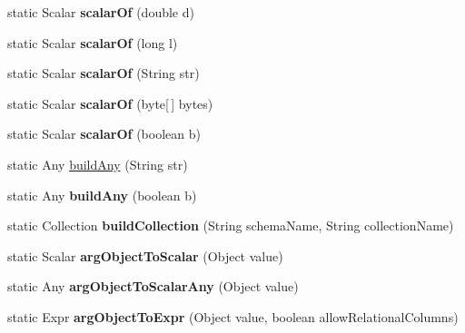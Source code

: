 \begin{DoxyCompactItemize}
static Scalar {\bfseries scalar\+Of} (double d)
\item 
\mbox{\label{classcom_1_1mysql_1_1cj_1_1xdevapi_1_1_expr_util_a224d0bdfc11fd3271126c9a0d4a94e49}} 
static Scalar {\bfseries scalar\+Of} (long l)
\item 
\mbox{\label{classcom_1_1mysql_1_1cj_1_1xdevapi_1_1_expr_util_acd10bb6f827786d7e8aa552a1db8c70f}} 
static Scalar {\bfseries scalar\+Of} (String str)
\item 
\mbox{\label{classcom_1_1mysql_1_1cj_1_1xdevapi_1_1_expr_util_a637b00ef4a3f4a3e50d25db59626e747}} 
static Scalar {\bfseries scalar\+Of} (byte\mbox{[}$\,$\mbox{]} bytes)
\item 
\mbox{\label{classcom_1_1mysql_1_1cj_1_1xdevapi_1_1_expr_util_af1782a40f28bd94a760758849f1aeb69}} 
static Scalar {\bfseries scalar\+Of} (boolean b)
\item 
static Any \mbox{\hyperlink{classcom_1_1mysql_1_1cj_1_1xdevapi_1_1_expr_util_a458c1372111de4a2a83a79ba595a89e5}{build\+Any}} (String str)
\item 
\mbox{\label{classcom_1_1mysql_1_1cj_1_1xdevapi_1_1_expr_util_ae1207346249eeed5d3ae7507a3017889}} 
static Any {\bfseries build\+Any} (boolean b)
\item 
\mbox{\label{classcom_1_1mysql_1_1cj_1_1xdevapi_1_1_expr_util_a83642d82477cb44df92d81addefb0f2c}} 
static Collection {\bfseries build\+Collection} (String schema\+Name, String collection\+Name)
\item 
\mbox{\label{classcom_1_1mysql_1_1cj_1_1xdevapi_1_1_expr_util_ac2bbde762a04d17b35a9c89ddebca625}} 
static Scalar {\bfseries arg\+Object\+To\+Scalar} (Object value)
\item 
\mbox{\label{classcom_1_1mysql_1_1cj_1_1xdevapi_1_1_expr_util_abdbe1af87cb894cea7e682b53bcb1dea}} 
static Any {\bfseries arg\+Object\+To\+Scalar\+Any} (Object value)
\item 
\mbox{\label{classcom_1_1mysql_1_1cj_1_1xdevapi_1_1_expr_util_a1f63ac5de16e1f9c1bfb6a58fe9fb8c7}} 
static Expr {\bfseries arg\+Object\+To\+Expr} (Object value, boolean allow\+Relational\+Columns)
\end{DoxyCompactItemize}


